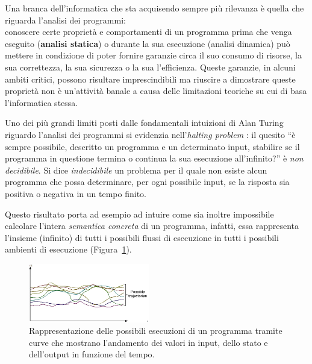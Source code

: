 Una branca dell'informatica che sta acquisendo sempre più rilevanza è quella che riguarda l'analisi dei programmi: \\conoscere certe proprietà e comportamenti di un programma prima che venga eseguito (\textbf{analisi statica}) o durante la sua esecuzione (analisi dinamica) può mettere in condizione di poter fornire garanzie circa il suo consumo di risorse, la sua correttezza, la sua sicurezza o la sua l'efficienza.
Queste garanzie, in alcuni ambiti critici, possono risultare imprescindibili ma riuscire a dimostrare queste proprietà non è un'attività banale a causa delle limitazioni teoriche su cui di basa l'informatica stessa.

Uno dei più grandi limiti posti dalle fondamentali intuizioni di Alan Turing riguardo l'analisi dei programmi si evidenzia nell'\textit{halting problem} \cite{Turing1936}: il quesito ``è sempre possibile, descritto un programma e un determinato input, stabilire se il programma in questione termina o continua la sua esecuzione all'infinito?'' è \textit{non decidibile}.
Si dice \textit{indecidibile} un problema per il quale non esiste alcun programma che possa determinare, per ogni possibile input, se la risposta sia positiva o negativa in un tempo finito.

Questo risultato porta ad esempio ad intuire come sia inoltre impossibile calcolare l'intera \textit{semantica concreta} di un programma, infatti, essa rappresenta l'insieme (infinito) di tutti i possibili flussi di esecuzione in tutti i possibili ambienti di esecuzione (Figura~\ref{fig:semantica_concreta}).

\begin{figure}[ht]
    \centering
    \includegraphics[width=0.47\textwidth]{figures/semantica_concreta.png}
    \caption{Rappresentazione delle possibili esecuzioni di un programma tramite curve che mostrano l'andamento dei valori in input, dello stato e dell'output in funzione del tempo.}
    \label{fig:semantica_concreta}
\end{figure}

